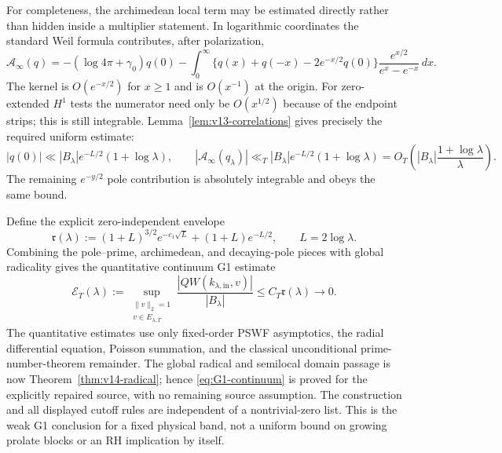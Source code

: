 \documentclass[11pt]{article}
\theoremstyle{remark}
\begin{document}
For completeness, the archimedean local term may be estimated directly rather than hidden inside a multiplier statement.  In logarithmic coordinates the standard Weil formula contributes, after polarization,
\[
 \mathcal A_\infty(q)=-(\log 4\pi+\gamma_0)q(0)
 -\int_0^\infty
 \{q(x)+q(-x)-2e^{-x/2}q(0)\}
 \frac{e^{x/2}}{e^x-e^{-x}}\,dx .
\]
The kernel is $O(e^{-x/2})$ for $x\ge1$ and is $O(x^{-1})$ at the origin.
For zero-extended $H^1$ tests the numerator need only be $O(x^{1/2})$
because of the endpoint strips; this is still integrable. Lemma~\ref{lem:v13-correlations}
gives precisely the required uniform estimate:
\[
 |q(0)|\ll |B_\lambda|e^{-L/2}(1+\log\lambda),\qquad
 |\mathcal A_\infty(q_\lambda)|\ll_T |B_\lambda|e^{-L/2}(1+\log\lambda)
 =O_T\!\left(|B_\lambda|\frac{1+\log\lambda}{\lambda}\right).
\]
The remaining $e^{-y/2}$ pole contribution is absolutely integrable and obeys the same bound.

Define the explicit zero-independent envelope
\begin{equation}\label{eq:G1-envelope}
 \mathfrak r(\lambda)
 :=(1+L)^{3/2}e^{-c_1\sqrt L}+(1+L)e^{-L/2},
 \qquad L=2\log\lambda.
\end{equation}
Combining the pole--prime, archimedean, and decaying-pole pieces with global radicality gives the quantitative continuum G1 estimate
\begin{equation}\label{eq:G1-continuum}
 \boxed{
 \mathcal E_T(\lambda):=
 \sup_{\substack{\|v\|_2=1\\ v\in E_{\lambda,T}}}
 \frac{|QW(k_{\lambda,\mathrm{in}},v)|}{|B_\lambda|}
 \le C_T\mathfrak r(\lambda)\longrightarrow0.}
\end{equation}
The quantitative estimates use only fixed-order PSWF asymptotics, the
radial differential equation, Poisson summation, and the classical
unconditional prime-number-theorem remainder. The global radical and
semilocal domain passage is now Theorem~\ref{thm:v14-radical}; hence
\eqref{eq:G1-continuum} is proved for the explicitly repaired source,
with no remaining source assumption. The construction and all displayed
cutoff rules are independent of a nontrivial-zero list. This is the weak
G1 conclusion for a fixed physical band, not a uniform bound on growing
prolate blocks or an RH implication by itself.
\end{document}
